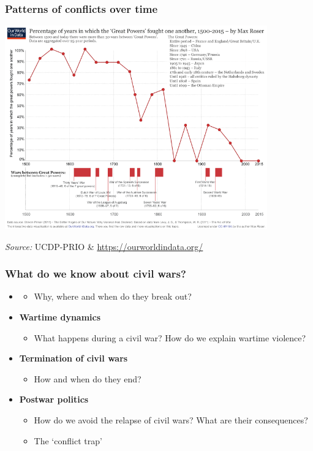 \documentclass[aspectratio=43]{beamer}
\begin{document}
\begin{frame}
\frametitle{Patterns of conflicts over time}
\centering

\includegraphics[width = 0.85\textwidth]{img/great_powers_wars}

{\small \textit{Source:} UCDP-PRIO \& \url{https://ourworldindata.org/}}

\end{frame}

\begin{frame}
\frametitle{What do we know about civil wars?}
\centering

\begin{itemize}
  \item<1-> 
  \begin{itemize}
    \item Why, where and when do they break out?
  \end{itemize}
  \item<2-> \textbf{Wartime dynamics}
  \begin{itemize}
    \item What happens during a civil war? How do we explain wartime violence?
  \end{itemize}
  \item<3-> \textbf{Termination of civil wars}
  \begin{itemize}
    \item How and when do they end?
  \end{itemize}
  \item<4-> \textbf{Postwar politics}
  \begin{itemize}
    \item How do we avoid the relapse of civil wars? What are their consequences?
    \item The `conflict trap'
  \end{itemize}
\end{itemize}

\end{frame}
\end{document}
